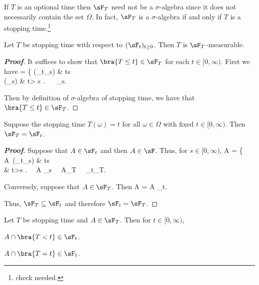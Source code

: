 \begin{remark}
If $T$ is an optional time then $\sF_T$ need not be a $\sigma$-algebra since it does not necessarily contain the set $\Omega$. In fact, $\sF_T$ is a $\sigma$-algebra if and only if $T$ is a stopping time.\footnote{check needed.}
\end{remark}


\begin{proposition}\label{pro:stopping_time_is_sigma_algebra_of_stopping_time_measurable}
Let $T$ be stopping time with respect to $(\sF_t)_{t\geq 0}$. Then $T$ is $\sF_T$-measurable.
\end{proposition}

\begin{proof}[\bf Proof]
It suffices to show that $\bra{T\leq t}\in \sF_T$ for each $t\in [0,\infty)$. First we have
\be
{}\cap {} = \left\{
 (\in \sF_t\subseteq \sF_s) \quad\quad & t\leq s \\
(\in \sF_s) & t> s
\ea
\right. \ \ra\ \cap {} \in \sF_s.
\ee

Then by definition of $\sigma$-algebra of stopping time, we have that $\bra{T\leq t}\in \sF_T$.
\end{proof}

\begin{proposition}
Suppose the stopping time $T(\omega)=t$ for all $\omega \in \Omega$ with fixed $t\in [0,\infty)$. Then $\sF_T = \sF_t$.
\end{proposition}

\begin{proof}[\bf Proof]
Suppose that $A\in \sF_t$ and then $A\in \sF$. Thus, for $s\in [0,\infty)$,
\be
A\cap {} = \left\{
A\ (\in \sF_t\subseteq \sF_s) \quad\quad & t\leq s \\
\emptyset & t>s
\ea\right. \ \ra\ A\cap {} \in \sF_s \ \ra\ A\in \sF_T \ \ra\ \sF_t\subseteq \sF_T.
\ee

Conversely, suppose that $A\in \sF_T$. Then
\be
A = A \cap {} \in \sF_t.
\ee

Thus, $\sF_T\subseteq \sF_t$ and therefore $\sF_t= \sF_T$.
\end{proof}


\begin{lemma}\label{lem:sigma_algebra_stopping_time_continuous_strictly_smaller_equal}
Let $T$ be stopping time and $A\in \sF_T$. Then for $t\in [0,\infty)$,
\ben
\item [(i)] $A\cap \bra{T<t} \in \sF_t$.
\item [(ii)] $A\cap \bra{T=t}\in \sF_t$.
\een
\end{lemma}


